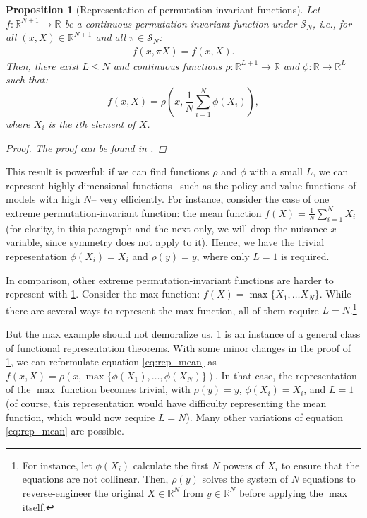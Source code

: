 \documentclass[12pt]{article}
\newtheorem{proposition}{Proposition}
\newcommand{\R}{\ensuremath{\mathbb{R}}}
\begin{document}
\begin{proposition}[Representation of permutation-invariant functions]\label{prop:rep-permutation-invariant}
Let  $f:\mathbb{R}^{N+1} \rightarrow \mathbb{R}$ be a continuous permutation-invariant function under $\mathcal{S}_N$, i.e., for all $(x,X) \in \mathbb{R}^{N+1}$ and all $\pi \in \mathcal{S}_N$:
\begin{align*}
f(x, \pi X) = f(x,X).
\end{align*}
Then, there exist $L\leq N$ and continuous functions $\rho : \mathbb{R}^{L+1}\rightarrow \mathbb{R}$ and $\phi: \mathbb{R} \rightarrow \mathbb{R}^L$ such that:
\begin{equation}
f(x,X) = \rho \left(x,\frac{1}{N}\sum_{i=1}^N\phi(X_i)\right),
\label{eq:rep_mean}
\end{equation}
where $X_i$ is the $i$th element of $X$. 
\begin{proof}
The proof can be found in \citet{wagstaff2019limitations}.
\end{proof}
\end{proposition}

This result is powerful: if we can find functions $\rho$ and $\phi$ with a small $L$, we can represent highly dimensional functions --such as the policy and value functions of models with high $N$-- very efficiently. For instance, consider the case of one extreme permutation-invariant function: the mean function $f(X) = \frac{1}{N}\sum_{i=1}^N X_i$ (for clarity, in this paragraph and the next only, we will drop the nuisance $x$ variable, since symmetry does not apply to it). Hence, we have the trivial representation $\phi(X_i) = X_i$ and $\rho(y) = y$, where only $L=1$ is required. 

In comparison, other extreme permutation-invariant functions are harder to represent with \cref{prop:rep-permutation-invariant}. Consider the max function: $f(X) = \max\{X_1, \ldots X_N\}$. While there are several ways to represent the max function, all of them require $L = N$.\footnote{For instance, let $\phi(X_i)$ calculate the first $N$ powers of $X_i$ to ensure that the equations are not collinear. Then, $\rho(y)$ solves the system of $N$ equations to reverse-engineer the original $X \in \R^N$ from $y \in \R^N$ before applying the $\max$ itself.}

But the max example should not demoralize us. \cref{prop:rep-permutation-invariant} is an instance of a general class of functional representation theorems. With some minor changes in the proof of \cref{prop:rep-permutation-invariant}, we can reformulate equation \eqref{eq:rep_mean} as $f(x,X) = \rho \left(x,\max\{\phi(X_1), \ldots, \phi(X_N)\}\right)$. In that case, the representation of the $\max$ function becomes trivial, with $\rho(y) = y$, $\phi(X_i) = X_i$, and $L=1$ (of course, this representation would have difficulty representing the mean function, which would now require $L=N$). Many other variations of equation \eqref{eq:rep_mean} are possible.
\end{document}
